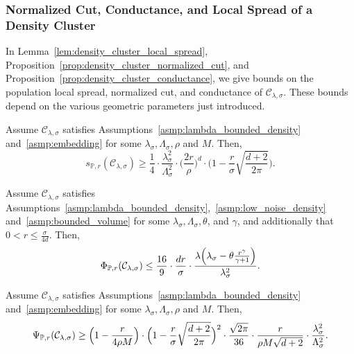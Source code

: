 \documentclass[twoside,11pt]{article}
\newcommand{\1}{\mathbf{1}}
\newcommand{\mc}[1]{\mathcal{#1}}
\newcommand{\Pbb}{\mathbb{P}}
\begin{document}
\subsubsection{Normalized Cut, Conductance, and Local Spread of a Density Cluster} In Lemma~\ref{lem:density_cluster_local_spread}, Proposition~\ref{prop:density_cluster_normalized_cut}, and Proposition~\ref{prop:density_cluster_conductance}, we give bounds on the population local spread, normalized cut, and conductance of $\mc{C}_{\lambda,\sigma}$. These bounds depend on the various geometric parameters just introduced. 
\begin{lemma}
	\label{lem:density_cluster_local_spread}
	Assume $\mc{C}_{\lambda,\sigma}$ satisfies Assumptions~\ref{asmp:lambda_bounded_density} and~\ref{asmp:embedding} for some $\lambda_{\sigma},\Lambda_{\sigma},\rho$ and $M$. Then,
	\begin{equation}
	\label{eqn:density_cluster_local_spread}
	s_{\Pbb,r}(\mc{C}_{\lambda,\sigma}) \geq \frac{1}{4} \cdot \frac{\lambda_{\sigma}^2}{\Lambda_{\sigma}^2} \cdot \biggl(\frac{2r}{\rho}\biggr)^{d} \cdot \biggl(1 - \frac{r}{\sigma} \sqrt{\frac{d + 2}{2\pi}}\biggr).
	\end{equation}
\end{lemma}

\begin{proposition}
	\label{prop:density_cluster_normalized_cut}
	Assume $\mc{C}_{\lambda,\sigma}$ satisfies Assumptions~\ref{asmp:lambda_bounded_density},~\ref{asmp:low_noise_density} and~\ref{asmp:bounded_volume} for some $\lambda_{\sigma}, \Lambda_{\sigma}, \theta$, and $\gamma$, and additionally that $0 < r \leq \frac{\sigma}{4d}$. Then,
	\begin{equation}
	\label{eqn:density_cluster_normalized_cut}
	\Phi_{\Pbb,r}(\mc{C}_{\lambda,\sigma}) \leq \frac{16}{9} \cdot \frac{dr}{\sigma} \cdot \frac{\lambda\Bigl(\lambda_{\sigma} - \theta \frac{r^{\gamma}}{\gamma + 1}\Bigr)}{\lambda_{\sigma}^2}.
	\end{equation}
\end{proposition}

\begin{proposition}
	\label{prop:density_cluster_conductance}
	Assume $\mc{C}_{\lambda,\sigma}$ satisfies Assumptions~\ref{asmp:lambda_bounded_density} and~\ref{asmp:embedding} for some $\lambda_{\sigma}, \Lambda_{\sigma}, \rho$ and $M$. Then,
	\begin{equation}
	\label{eqn:density_cluster_conductance}
	\Psi_{\Pbb,r}(\mc{C}_{\lambda,\sigma}) \geq \Bigl(1 - \frac{r}{4\rho M}\Bigr) \cdot \Bigl(1 - \frac{r}{\sigma}\sqrt{\frac{d + 2}{2\pi}}\Bigr)^2 \cdot \frac{\sqrt{2\pi}}{36} \cdot \frac{r}{\rho M \sqrt{d + 2}} \cdot \frac{\lambda_{\sigma}^2}{\Lambda_{\sigma}^2}.
	\end{equation}
\end{proposition}
\end{document}

